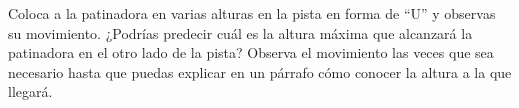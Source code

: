 Coloca a la patinadora en varias alturas en la pista en forma de “U” y observas su movimiento. ¿Podrías predecir cuál es la altura máxima que alcanzará la patinadora en el otro lado de la pista? Observa el movimiento las veces que sea necesario hasta que puedas explicar en un párrafo cómo conocer la altura a la que llegará.

\begin{solutionbox}{6cm}
\end{solutionbox}
